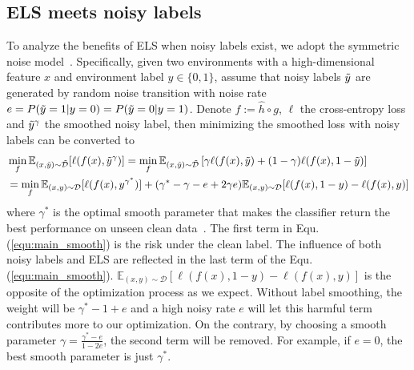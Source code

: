 \documentclass{article} \usepackage{iclr2023_conference,times}
\newcommand{\ls}[0]{ELS\xspace}
\newcommand{\myref}[1]{Equ. (\ref{#1})}
\begin{document}
\subsection{\ls meets noisy labels}
\vspace{-0.15cm}
To analyze the benefits of \ls when noisy labels exist, we  adopt the symmetric noise model~\citep{kim2019nlnl}. Specifically, given two environments with a high-dimensional feature $x$ and environment label $y\in\{0,1\}$, assume that noisy labels $\Tilde{y}$ are generated by random noise transition with noise rate $e=P(\Tilde{y}=1|y=0)=P(\Tilde{y}=0|y=1)$. Denote $f:=\hat{h}\circ g$, $\ell$ the cross-entropy loss and $\Tilde{y}^\gamma$ the smoothed noisy label, then minimizing the smoothed loss with noisy labels can be converted to
\begin{equation}
\begin{aligned}
&\min_f \mathbb{E}_{(x,\Tilde{y})\sim\Tilde{\mathcal{D}}}[\ell(f(x),\Tilde{y}^\gamma)]=\min_{f}\mathbb{E}_{(x,\Tilde{y})\sim\Tilde{\mathcal{D}}}\left[\gamma\ell(f(x), \Tilde{y})+(1-\gamma)\ell(f(x), 1-\Tilde{y})\right]\\
&=\min_{f}\mathbb{E}_{(x,y)\sim\mathcal{D}}[\ell(f(x),y^{\gamma^*})]+(\gamma^*-\gamma-e+2\gamma e)\mathbb{E}_{(x,y)\sim\mathcal{D}}[\ell(f(x),1-y)-\ell(f(x),y)]
\end{aligned}
\label{equ:main_smooth}
\end{equation}
where $\gamma^*$ is the optimal smooth parameter that makes the classifier return the best performance on unseen clean data~\citep{wei2021smooth}. The first term in \myref{equ:main_smooth} is the risk under the clean label. The influence of both noisy labels and \ls are reflected in the last term of the \myref{equ:main_smooth}. $\mathbb{E}_{(x,y)\sim\mathcal{D}}[\ell(f(x),1-y)-\ell(f(x),y)]$ is the opposite of the optimization process as we expect. Without label smoothing, the weight will be $\gamma^*-1+e$ and a high noisy rate $e$ will let this harmful term contributes more to our optimization. On the contrary, by choosing a smooth parameter $\gamma=\frac{\gamma^*-e}{1-2e}$, the second term will be removed. For example, if $e=0$, the best smooth parameter is just $\gamma^*$.

\vspace{-0.15cm}
\end{document}
